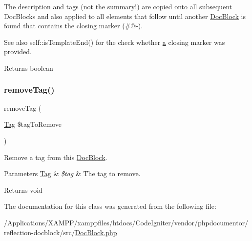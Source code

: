 The description and tags (not the summary!) are copied onto all subsequent Doc\+Blocks and also applied to all elements that follow until another \mbox{\hyperlink{classphp_documentor_1_1_reflection_1_1_doc_block}{Doc\+Block}} is found that contains the closing marker ({\ttfamily \#@-\/}).

\begin{DoxySeeAlso}{See also}
self\+::is\+Template\+End() for the check whether \mbox{\hyperlink{interfacea}{a}} closing marker was provided.
\end{DoxySeeAlso}
\begin{DoxyReturn}{Returns}
boolean 
\end{DoxyReturn}
\mbox{\label{classphp_documentor_1_1_reflection_1_1_doc_block_a64cf2a1793b4e644969b1ae53e272a4a}} 
\subsubsection{\texorpdfstring{remove\+Tag()}{removeTag()}}
{\footnotesize\ttfamily remove\+Tag (\begin{DoxyParamCaption}\item[{\mbox{\hyperlink{interfacephp_documentor_1_1_reflection_1_1_doc_block_1_1_tag}{Tag}}}]{\$tag\+To\+Remove }\end{DoxyParamCaption})}

Remove a tag from this \mbox{\hyperlink{classphp_documentor_1_1_reflection_1_1_doc_block}{Doc\+Block}}.


\begin{DoxyParams}[1]{Parameters}
\mbox{\hyperlink{interfacephp_documentor_1_1_reflection_1_1_doc_block_1_1_tag}{Tag}} & {\em \$tag} & The tag to remove.\\
\hline
\end{DoxyParams}
\begin{DoxyReturn}{Returns}
void 
\end{DoxyReturn}


The documentation for this class was generated from the following file\+:\begin{DoxyCompactItemize}
\item 
/\+Applications/\+X\+A\+M\+P\+P/xamppfiles/htdocs/\+Code\+Igniter/vendor/phpdocumentor/reflection-\/docblock/src/\mbox{\hyperlink{_doc_block_8php}{Doc\+Block.\+php}}\end{DoxyCompactItemize}
